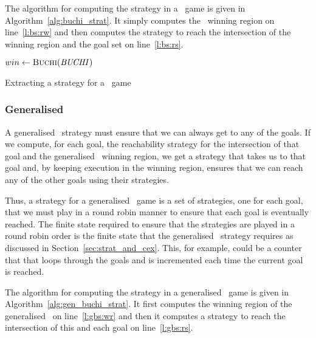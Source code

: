 The algorithm for computing the strategy in a \buchi\ game is given in Algorithm~\ref{alg:buchi_strat}. It simply computes the \buchi\ winning region on line~\ref{l:bs:rw} and then computes the strategy to reach the intersection of the winning region and the goal set on line~\ref{l:bs:rs}.

\begin{algorithm}[t]
\begin{algorithmic}[1]

    \State $win \gets \Call{Buchi}{\buchiobj}$ \label{l:bs:rw}
    \State \Return {} \label{l:bs:rs}
\EndFunction

\end{algorithmic}
\caption{Extracting a strategy for a \buchi\ game}
\label{alg:buchi_strat}
\end{algorithm}

\subsubsection{Generalised \buchi}
\label{sec:genbuch}

A generalised \buchi\ strategy must ensure that we can always get to any of the goals. If we compute, for each goal, the reachability strategy for the intersection of that goal and the generalised \buchi\ winning region, we get a strategy that takes us to that goal and, by keeping execution in the winning region, ensures that we can reach any of the other goals using their strategies. 

Thus, a strategy for a generalised \buchi\ game is a set of strategies, one for each goal, that we must play in a round robin manner to ensure that each goal is eventually reached. The finite state required to ensure that the strategies are played in a round robin order is the finite state that the generalised \buchi\ strategy requires as discussed in Section~\ref{sec:strat_and_cex}. This, for example, could be a counter that that loops through the goals and is incremented each time the current goal is reached.

The algorithm for computing the strategy in a generalised \buchi\ game is given in Algorithm~\ref{alg:gen_buchi_strat}. It first computes the winning region of the generalised \buchi\ on line~\ref{l:gbs:wr} and then it computes a strategy to reach the intersection of this and each goal on line~\ref{l:gbs:rs}.

